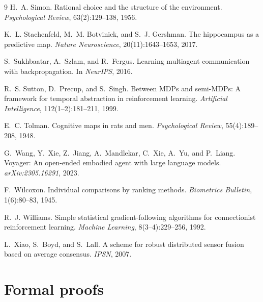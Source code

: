 \documentclass{article}
\begin{document}
{\begin{thebibliography}{9}
H.~A. Simon.
\newblock Rational choice and the structure of the environment.
\newblock \emph{Psychological Review}, 63(2):129--138, 1956.

K.~L. Stachenfeld, M.~M. Botvinick, and S.~J. Gershman.
\newblock The hippocampus as a predictive map.
\newblock \emph{Nature Neuroscience}, 20(11):1643--1653, 2017.

S.~Sukhbaatar, A.~Szlam, and R.~Fergus.
\newblock Learning multiagent communication with backpropagation.
\newblock In \emph{NeurIPS}, 2016.

R.~S. Sutton, D.~Precup, and S.~Singh.
\newblock Between MDPs and semi-MDPs: A framework for temporal abstraction in reinforcement learning.
\newblock \emph{Artificial Intelligence}, 112(1--2):181--211, 1999.

E.~C. Tolman.
\newblock Cognitive maps in rats and men.
\newblock \emph{Psychological Review}, 55(4):189--208, 1948.

G.~Wang, Y.~Xie, Z.~Jiang, A.~Mandlekar, C.~Xie, A.~Yu, and P.~Liang.
\newblock Voyager: An open-ended embodied agent with large language models.
\newblock \emph{arXiv:2305.16291}, 2023.

F.~Wilcoxon.
\newblock Individual comparisons by ranking methods.
\newblock \emph{Biometrics Bulletin}, 1(6):80--83, 1945.

R.~J. Williams.
\newblock Simple statistical gradient-following algorithms for connectionist reinforcement learning.
\newblock \emph{Machine Learning}, 8(3--4):229--256, 1992.

L.~Xiao, S.~Boyd, and S.~Lall.
\newblock A scheme for robust distributed sensor fusion based on average consensus.
\newblock \emph{IPSN}, 2007.

\end{thebibliography}
}

\appendix

\section{Formal proofs}
\label{app:proofs}
\end{document}
